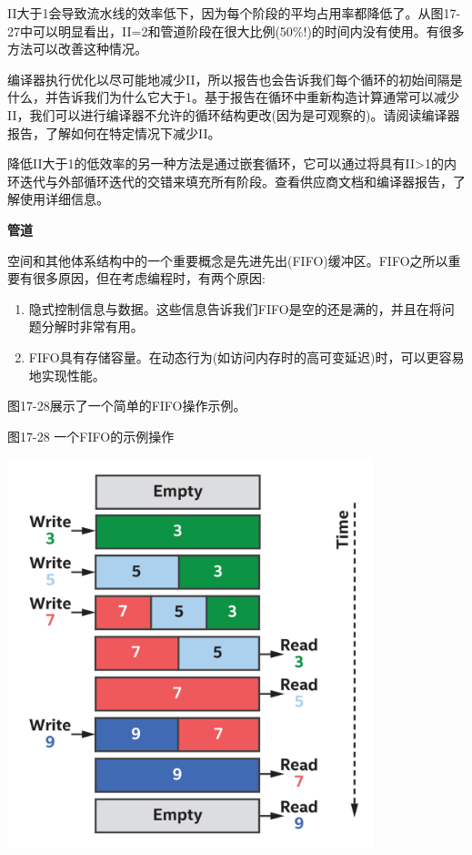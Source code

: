 II大于1会导致流水线的效率低下，因为每个阶段的平均占用率都降低了。从图17-27中可以明显看出，II=2和管道阶段在很大比例(50\%!)的时间内没有使用。有很多方法可以改善这种情况。\par

编译器执行优化以尽可能地减少II，所以报告也会告诉我们每个循环的初始间隔是什么，并告诉我们为什么它大于1。基于报告在循环中重新构造计算通常可以减少II，我们可以进行编译器不允许的循环结构更改(因为是可观察的)。请阅读编译器报告，了解如何在特定情况下减少II。\par

降低II大于1的低效率的另一种方法是通过嵌套循环，它可以通过将具有II>1的内环迭代与外部循环迭代的交错来填充所有阶段。查看供应商文档和编译器报告，了解使用详细信息。\par

\hspace*{\fill} \par %
\textbf{管道}

空间和其他体系结构中的一个重要概念是先进先出(FIFO)缓冲区。FIFO之所以重要有很多原因，但在考虑编程时，有两个原因:\par

\begin{enumerate}
	\item 隐式控制信息与数据。这些信息告诉我们FIFO是空的还是满的，并且在将问题分解时非常有用。
	\item FIFO具有存储容量。在动态行为(如访问内存时的高可变延迟)时，可以更容易地实现性能。
\end{enumerate}

图17-28展示了一个简单的FIFO操作示例。\par

\hspace*{\fill} \par %
图17-28 一个FIFO的示例操作
\begin{center}
	\includegraphics[width=0.8\textwidth]{content/chapter-17/images/23}
\end{center}

